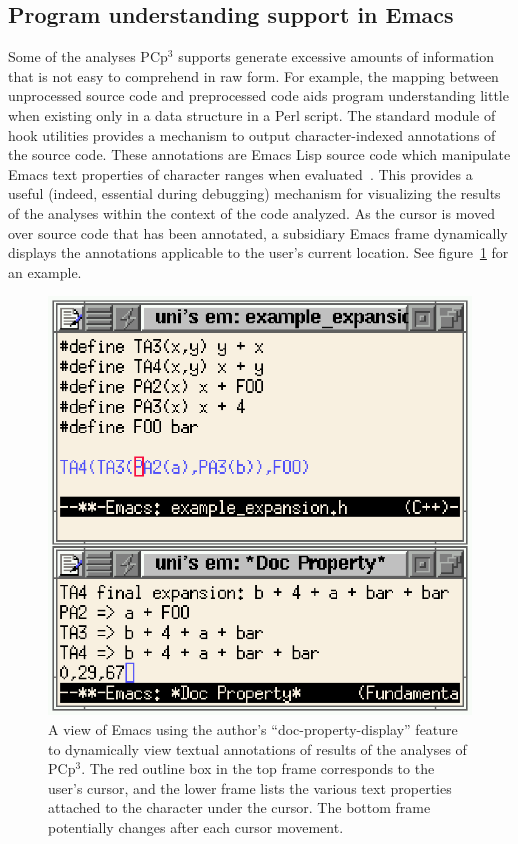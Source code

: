 \documentclass{article}
\newcommand{\pcp}{\mbox{\textsf{PCp}$^3$}}
\newcommand{\Perl}{\mbox{\textsf{Perl}}}
\begin{document}
\subsection{Program understanding support in Emacs}
Some of the analyses \pcp{} supports generate excessive amounts of
information that is not easy to comprehend in raw form.  For example,
the mapping between unprocessed source code and preprocessed code aids
program understanding little when existing only in a data structure in a
\Perl{} script.  The standard module of hook utilities provides a
mechanism to output character-indexed annotations of the source code.
These annotations are Emacs Lisp source code which manipulate Emacs text
properties of character ranges when evaluated~\cite{GNUELisp}.  This provides a useful
(indeed, essential during debugging) mechanism for visualizing the
results of the analyses within the context of the code analyzed.  As the
cursor is moved over source code that has been annotated, a subsidiary
Emacs frame dynamically displays the annotations applicable to the
user's current location. See figure~\ref{fig:emacsdocprop} for an
example.

\begin{figure}[p]
  \begin{center}
    \leavevmode
    \includegraphics{figs/doc-prop.ps}
    \caption{A view of Emacs using the author's ``doc-property-display''
      feature to dynamically view textual annotations of results of the
      analyses of \pcp{}.  The red outline box in the top frame
      corresponds to the user's cursor, and the lower frame lists the
      various text properties attached to the character under the
      cursor.  The bottom frame potentially changes after each cursor movement.}
    \label{fig:emacsdocprop}
  \end{center}
\end{figure}
\end{document}
